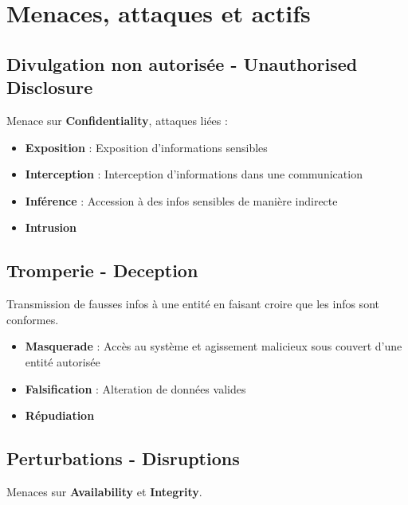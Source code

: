\documentclass{report}
\begin{document}
	\section{Menaces, attaques et actifs}

		\subsection{Divulgation non autorisée - Unauthorised Disclosure}

			Menace sur \textbf{Confidentiality}, attaques liées : \\

			\begin{itemize}
				\item \textbf{Exposition} : Exposition d'informations sensibles
				\item \textbf{Interception} : Interception d'informations dans une communication
				\item \textbf{Inférence} : Accession à des infos sensibles de manière indirecte
				\item \textbf{Intrusion}\\
			\end{itemize}

		\subsection{Tromperie - Deception}

			Transmission de fausses infos à une entité en faisant croire que les infos sont conformes. \\

			\begin{itemize}
				\item \textbf{Masquerade} : Accès au système et agissement malicieux sous couvert d'une entité autorisée
				\item \textbf{Falsification} : Alteration de données valides
				\item \textbf{Répudiation}\\
			\end{itemize}

		\subsection{Perturbations - Disruptions}

			Menaces sur \textbf{Availability} et \textbf{Integrity}.\\
\end{document}
